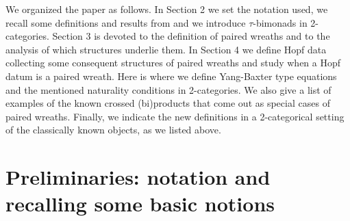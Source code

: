 \documentclass[a4paper, 12pt]{article}
\renewcommand{\_}[1]{\mbox{$_{\left( #1 \right)}$}}
\theoremstyle{plain}
\begin{document}
We organized the paper as follows. In Section 2 we set the notation used, we recall some definitions and results from \cite{Femic5} and we introduce $\tau$-bimonads in 2-categories. 
Section 3 is devoted to the definition of paired wreaths and to the analysis of which structures underlie them. In Section 4 we define Hopf data collecting some consequent structures of 
paired wreaths and study when a Hopf datum is a paired wreath. Here is where we define Yang-Baxter type equations and the mentioned naturality conditions in 2-categories. We also give a 
list of examples of the known crossed (bi)products that come out as special cases of paired wreaths. Finally, we indicate the new definitions in a 2-categorical setting of the classically 
known objects, as we listed above. 




\section{Preliminaries: notation and recalling some basic notions}
\end{document}
